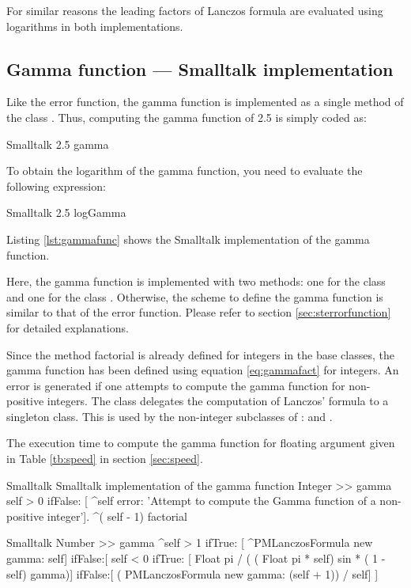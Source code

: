 For similar reasons the leading factors of Lanczos formula are
evaluated using logarithms in both implementations.

\subsection{Gamma function --- Smalltalk implementation}
Like the error function, the gamma function is implemented as a single method of the class .
Thus, computing the gamma function of 2.5 is simply coded
as:
\begin{displaycode}{Smalltalk}
2.5 gamma
\end{displaycode}
To obtain the logarithm of the gamma function, you need to
evaluate the following expression:
\begin{displaycode}{Smalltalk}
2.5 logGamma
\end{displaycode}

Listing \ref{lst:gammafunc} shows the Smalltalk implementation of the gamma
function.

Here, the gamma function is implemented with two methods: one for
the class  and one for the class .
Otherwise, the scheme to define the gamma function is similar to
that of the error function. Please refer to section
\ref{sec:sterrorfunction} for detailed explanations.

Since the method factorial is already defined for integers in the
base classes, the gamma function has been defined using equation
\ref{eq:gammafact} for integers. An error is generated if one
attempts to compute the gamma function for non-positive integers.
The class  delegates the computation of Lanczos'
formula to a singleton class. This is used by the non-integer
subclasses of :  and .

The execution time to compute the gamma function for floating
argument given in Table \ref{tb:speed} in section \ref{sec:speed}.

\begin{listing}[label=lst:gammafunc]{Smalltalk}
{Smalltalk implementation of the gamma function}
Integer >> gamma
    self > 0
        ifFalse: [ ^self error: 'Attempt to compute the Gamma 
        function of a non-positive integer'].
    ^( self - 1) factorial
\end{listing}

\begin{displaycode}{Smalltalk}
Number >> gamma
    ^self > 1
        ifTrue: [ ^PMLanczosFormula new gamma: self]
        ifFalse:[ self < 0
                     ifTrue: [ Float pi / ( ( Float pi * self) sin * ( 1 - self) gamma)]
                     ifFalse:[ ( PMLanczosFormula new gamma: (self + 1)) / self]
                    ]
\end{displaycode}

